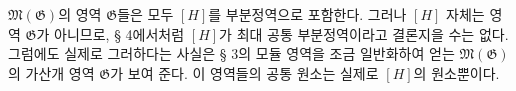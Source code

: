 
$\mathfrak M(\mathfrak G)$의 영역 $\mathfrak G$들은 모두 $[H]$를 부분정역으로 포함한다. 그러나 $[H]$ 자체는 영역 $\mathfrak G$가 아니므로, § 4에서처럼 $[H]$가 최대 공통 부분정역이라고 결론지을 수는 없다. 그럼에도 실제로 그러하다는 사실은 § 3의 모듈 영역을 조금 일반화하여 얻는 $\mathfrak M(\mathfrak G)$의 가산개 영역 $\mathfrak G$가 보여 준다. 이 영역들의 공통 원소는 실제로 $[H]$의 원소뿐이다.
